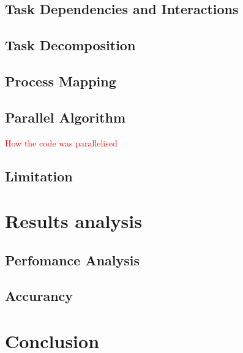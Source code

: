 \documentclass[12pt]{article}
\begin{document}
    	\subsection{Task Dependencies and Interactions}
    	
    	\subsection{Task Decomposition}
    	
    	\subsection{Process Mapping}
    	
    	\subsection{Parallel Algorithm}
    	\textcolor{red}{How the code was parallelised}
    	
    	\subsection{Limitation}

  	\section{Results analysis}
    	\begin{flushleft}
			
    	\end{flushleft}
    	
    	\subsection{Perfomance Analysis}
    	
    	\subsection{Accurancy}

	\section{Conclusion}
    	\begin{flushleft}
			
    	\end{flushleft}
\end{document}
